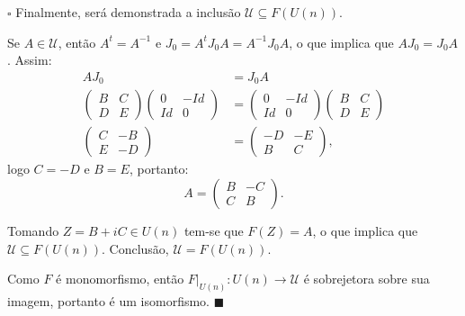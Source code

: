 \documentclass[12pt]{book}
\newenvironment{prova}[1]{$\square$ #1}{\hfill$\blacksquare$}
\newcommand{\estruturacomplexa}{J_{0}}
\newcommand{\matrizSimpleticaOrtogonal}{\mathcal{U}}
\newcommand{\matrizunitaria}[1]{U(#1)}
\begin{document}
\begin{prova}
		Finalmente, será demonstrada a inclusão $\matrizSimpleticaOrtogonal \subseteq F(\matrizunitaria{n})$. 
		
		Se $A \in \matrizSimpleticaOrtogonal$, então $A^{t}=A^{-1}$ e $\estruturacomplexa=A^{t}\estruturacomplexa  A=A^{-1}\estruturacomplexa A$, o que implica que $A\estruturacomplexa=\estruturacomplexa A$. Assim:
		$$
		\begin{aligned}
		A\estruturacomplexa&=\estruturacomplexa A
		\\
		\left(
		\begin{array}{cc}
		B & C
		\\
		D & E
		\end{array}
		\right)
		\left(
		\begin{array}{cc}
		0 & -Id
		\\
		Id & 0
		\end{array}
		\right)
		&=
		\left(
		\begin{array}{cc}
		0 & -Id
		\\
		Id & 0
		\end{array}
		\right)
		\left(
		\begin{array}{cc}
		B & C
		\\
		D & E
		\end{array}
		\right)
		\\
		\left(
		\begin{array}{cc}
		C & -B
		\\
		E & -D
		\end{array}
		\right)
		&=
		\left(
		\begin{array}{cc}
		-D & -E
		\\
		B & C
		\end{array}
		\right), 
		\end{aligned}
		$$
		logo $C=-D$ e $B=E$, portanto:
		$$
		A=\left(
		\begin{array}{cc}
		B & -C
		\\
		C & B
		\end{array}
		\right).
		$$
		
		Tomando $Z = B+iC \in \matrizunitaria{n}$ tem-se que $F(Z) = A$, o que implica que $\matrizSimpleticaOrtogonal \subseteq F(\matrizunitaria{n})$. Conclusão, $\matrizSimpleticaOrtogonal = F(\matrizunitaria{n})$. 
		
		Como $F$ é monomorfismo, então $F|_{\matrizunitaria{n}}:\matrizunitaria{n} \to \matrizSimpleticaOrtogonal$ é sobrejetora sobre sua imagem, portanto é um isomorfismo.
	\end{prova}
	
\end{document}
